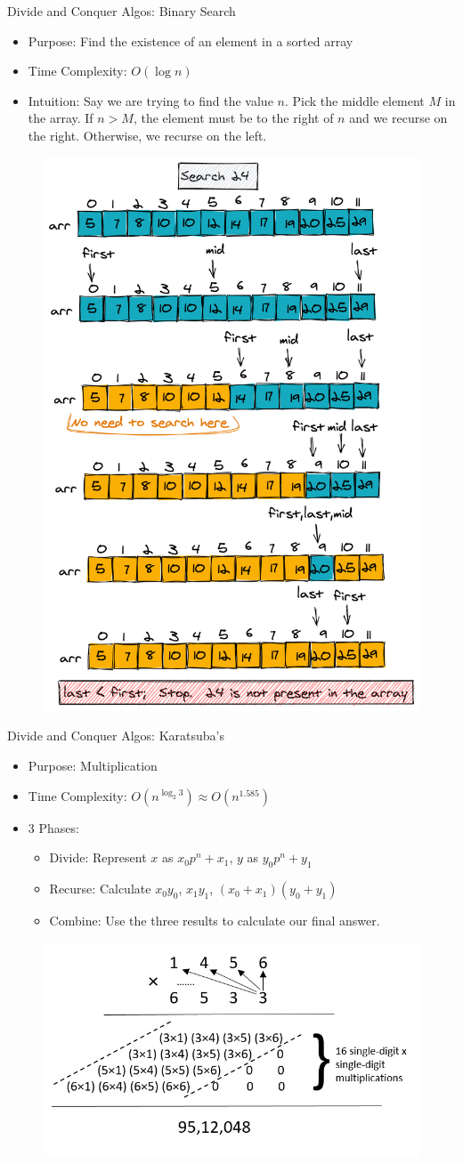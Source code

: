 \documentclass{beamer}
\begin{document}
\begin{frame}[t]{Divide and Conquer Algos: Binary Search}
    \begin{itemize}
        \item \alert{Purpose:} Find the existence of an element in a sorted array
        \item \alert{Time Complexity}: $O(\log n)$
        \item \alert{Intuition}: Say we are trying to find the value $n$. Pick the middle element $M$ in the array. If $n > M$, the element must be to the right of $n$ and we recurse on the right. Otherwise, we recurse on the left.
    \end{itemize}
    \begin{figure}
        \centering
        \includegraphics[width=0.25\linewidth]{binary.png}
    \end{figure}
\end{frame}


\begin{frame}[t]{Divide and Conquer Algos: Karatsuba's}
    \begin{itemize}
        \item \alert{Purpose:} Multiplication
        \item \alert{Time Complexity}: $O(n^{\log_2{3}}) \approx O(n^{1.585})$
        \item 3 Phases:
        \begin{itemize}
            \item \alert{Divide}: Represent $x$ as $x_0 p^n + x_1$, $y$ as $y_0 p^n + y_1$
            \item \alert{Recurse}: Calculate $x_0y_0$, $x_1y_1$, $(x_0 + x_1)(y_0 + y_1)$
            \item \alert{Combine}: Use the three results to calculate our final answer.
        \end{itemize}
        
    \end{itemize}
    \begin{figure}
        \centering
        \includegraphics[width=0.5\linewidth]{karatsuba.png}
    \end{figure}
\end{frame}
\end{document}
